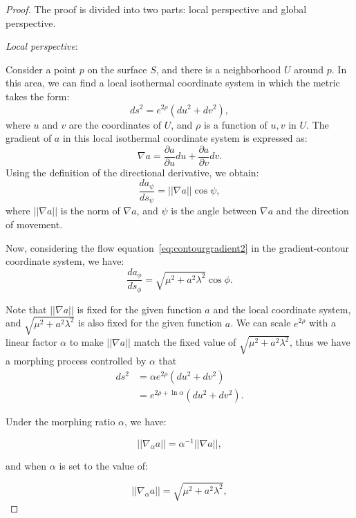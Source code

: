 \begin{proof}

    The proof is divided into two parts: local perspective and global perspective.

    \emph{Local perspective}:

    Consider a point \( p \) on the surface \( S \), and there is a neighborhood \( U \) around \( p \).
    In this area, we can find a local isothermal coordinate system in which the metric takes the form:
    \[ ds^2 = e^{2\rho}(du^2 + dv^2), \]
    where \( u \) and \( v \) are the coordinates of \( U \), and \( \rho \) is a function of \( u, v \) in \( U \).
    The gradient of \( a \) in this local isothermal coordinate system is expressed as:
    \[ \nabla a = \frac{\partial a}{\partial u} du + \frac{\partial a}{\partial v} dv. \]
    Using the definition of the directional derivative, we obtain:
    \[ \frac{da_{\psi}}{ds_{\psi}} = ||\nabla a|| \cos \psi, \]
    where \( ||\nabla a|| \) is the norm of \( \nabla a \), and \( \psi \) is the angle between \( \nabla a \) and the direction of movement.

    Now, considering the flow equation~\ref{eq:contourgradient2} in the gradient-contour coordinate system, we have:
    \[ \frac{da_{\phi}}{ds_{\phi}} = \sqrt{\mu^2 + a^2 \lambda^2} \cos \phi. \]

    Note that \( ||\nabla a|| \) is fixed for the given function \( a \) and the local coordinate system, and \( \sqrt{\mu^2 + a^2 \lambda^2} \) is also fixed for the given function \( a \).
    We can scale \( e^{2\rho} \) with a linear factor \( \alpha \) to make \( ||\nabla a|| \) match the fixed value of \( \sqrt{\mu^2 + a^2 \lambda^2} \),
    thus we have a morphing process controlled by \( \alpha \) that
    \begin{align}
    ds^2 &= \alpha e^{2 \rho}(du^2 + dv^2)\label{eq:morphing} \\
         &= e^{2 \rho + \ln \alpha}(du^2 + dv^2).
    \end{align}

    Under the morphing ratio \( \alpha \), we have:

    \begin{equation}
      ||\nabla_\alpha a|| = \alpha^{-1} ||\nabla a||,
    \end{equation}

    and when \( \alpha \) is set to the value of:

    \[ ||\nabla_\alpha a|| = \sqrt{\mu^2 + a^2 \lambda^2}, \]


\end{proof}
